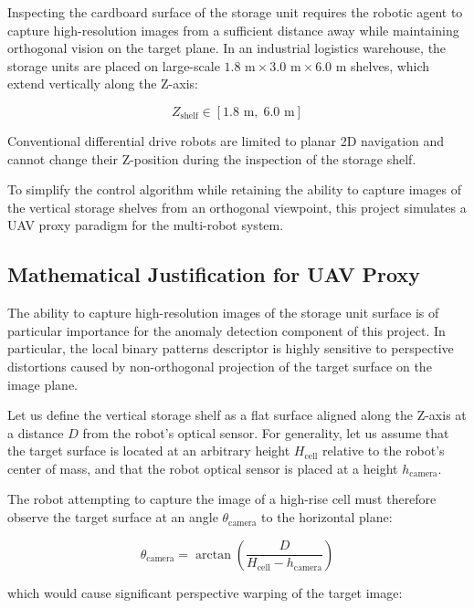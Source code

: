 Inspecting the cardboard surface of the storage unit requires the robotic agent to capture high-resolution images from a sufficient distance away while maintaining orthogonal vision on the target plane. In an industrial logistics warehouse, the storage units are placed on large-scale $1.8\text{ m} \times 3.0\text{ m} \times 6.0\text{ m}$ shelves, which extend vertically along the Z-axis:

\begin{equation}
Z_{\text{shelf}} \in [1.8\text{ m}, \; 6.0\text{ m}]
\end{equation}

Conventional differential drive robots are limited to planar 2D navigation and cannot change their Z-position during the inspection of the storage shelf.

To simplify the control algorithm while retaining the ability to capture images of the vertical storage shelves from an orthogonal viewpoint, this project simulates a UAV proxy paradigm for the multi-robot system.

\subsection{Mathematical Justification for UAV Proxy}

The ability to capture high-resolution images of the storage unit surface is of particular importance for the anomaly detection component of this project. In particular, the local binary patterns descriptor is highly sensitive to perspective distortions caused by non-orthogonal projection of the target surface on the image plane.

Let us define the vertical storage shelf as a flat surface aligned along the Z-axis at a distance $D$ from the robot's optical sensor. For generality, let us assume that the target surface is located at an arbitrary height $H_{\text{cell}}$ relative to the robot's center of mass, and that the robot optical sensor is placed at a height $h_{\text{camera}}$.

The robot attempting to capture the image of a high-rise cell must therefore observe the target surface at an angle $\theta_{\text{camera}}$ to the horizontal plane:

\begin{equation}
\theta_{\text{camera}} = \arctan\left(\frac{D}{H_{\text{cell}} - h_{\text{camera}}}\right)
\end{equation}

which would cause significant perspective warping of the target image:

